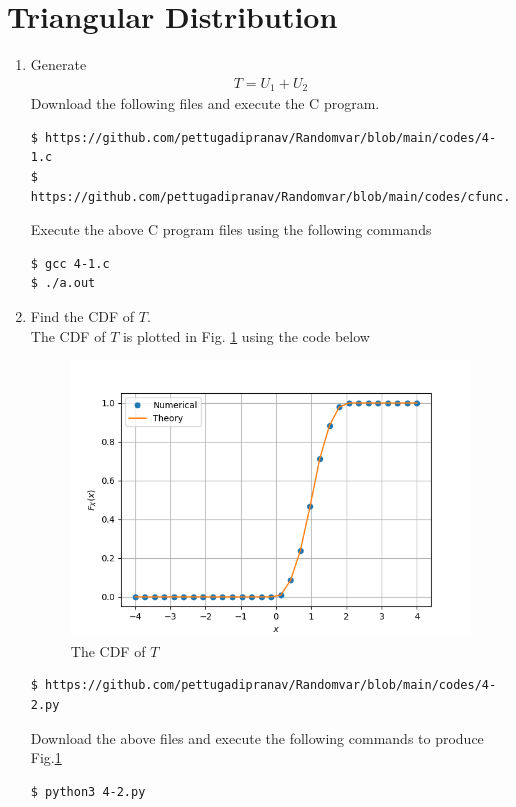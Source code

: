 \documentclass[journal,12pt,twocolumn]{IEEEtran}
\renewcommand\thesection{\arabic{section}}
\begin{document}
		
		
		
		\section{Triangular Distribution}
\begin{enumerate}[label=\thesection.\arabic*
,ref=\thesection.\theenumi]
\item Generate
    \begin{align}
        T=U_1+U_2
    \end{align}
    \solution Download the following files and execute the  C program.
\begin{lstlisting}
$ https://github.com/pettugadipranav/Randomvar/blob/main/codes/4-1.c
$ https://github.com/pettugadipranav/Randomvar/blob/main/codes/cfunc.h
\end{lstlisting}
Execute the above C program files using the following commands
\begin{lstlisting}
$ gcc 4-1.c
$ ./a.out
\end{lstlisting}

\item Find the CDF of $T$.\\
\solution The CDF of $T$ is plotted in Fig. \ref{fig:4.2} using the code below
\begin{figure}[!h]
\centering
\includegraphics[width=\columnwidth]{./figs/4-2.png}
\caption{The CDF of $T$}
\label{fig:4.2}
\end{figure}
\begin{lstlisting}
$ https://github.com/pettugadipranav/Randomvar/blob/main/codes/4-2.py

\end{lstlisting}
Download the above files and execute the following commands to produce Fig.\ref{fig:4.2}
\begin{lstlisting}
$ python3 4-2.py
\end{lstlisting}


\end{enumerate}
\end{document}

